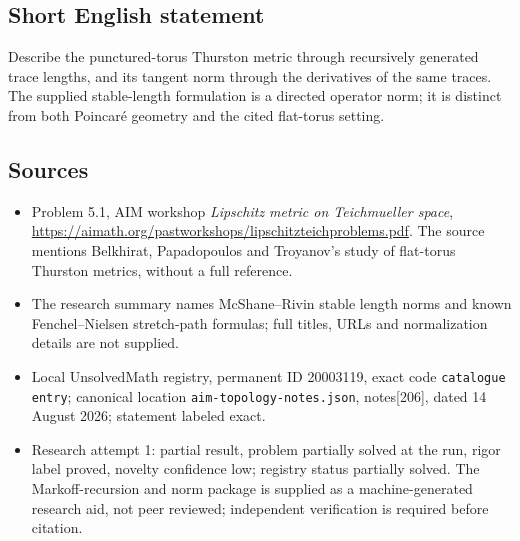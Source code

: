 \documentclass[11pt]{article}
\begin{document}
\subsection{Short English statement}
Describe the punctured-torus Thurston metric through recursively generated trace lengths, and its tangent norm through the derivatives of the same traces. The supplied stable-length formulation is a directed operator norm; it is distinct from both Poincar\'e geometry and the cited flat-torus setting.
\subsection{Sources}
\begin{itemize}
\item Problem 5.1, AIM workshop \emph{Lipschitz metric on Teichmueller space}, \url{https://aimath.org/pastworkshops/lipschitzteichproblems.pdf}. The source mentions Belkhirat, Papadopoulos and Troyanov's study of flat-torus Thurston metrics, without a full reference.
\item The research summary names McShane--Rivin stable length norms and known Fenchel--Nielsen stretch-path formulas; full titles, URLs and normalization details are not supplied.
\item Local UnsolvedMath registry, permanent ID 20003119, exact code \texttt{catalogue entry}; canonical location \texttt{aim-topology-notes.json}, notes[206], dated 14 August 2026; statement labeled exact.
\item Research attempt 1: partial result, problem partially solved at the run, rigor label proved, novelty confidence low; registry status partially solved. The Markoff-recursion and norm package is supplied as a machine-generated research aid, not peer reviewed; independent verification is required before citation.
\end{itemize}
\end{document}
